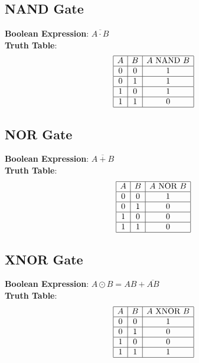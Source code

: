 \documentclass[10pt]{article}
\begin{document}
\begin{multicols}{3}
\subsection{NAND Gate}
\textbf{Boolean Expression}: \( \overline{A \cdot B} \) \\
\textbf{Truth Table}:
\[
\begin{array}{|c|c|c|}
\hline
A & B & A \text{ NAND } B \\
\hline
0 & 0 & 1 \\\hline
0 & 1 & 1 \\\hline
1 & 0 & 1 \\\hline
1 & 1 & 0 \\\hline
\end{array}
\]

\subsection{NOR Gate}
\textbf{Boolean Expression}: \( \overline{A + B} \) \\
\textbf{Truth Table}:
\[
\begin{array}{|c|c|c|}
\hline
A & B & A \text{ NOR } B \\
\hline
0 & 0 & 1 \\\hline
0 & 1 & 0 \\\hline
1 & 0 & 0 \\\hline
1 & 1 & 0 \\\hline
\end{array}
\]

\subsection{XNOR Gate}
\textbf{Boolean Expression}: \( A \odot B = AB + \overline{AB} \) \\
\textbf{Truth Table}:
\[
\begin{array}{|c|c|c|}
\hline
A & B & A \text{ XNOR } B \\
\hline
0 & 0 & 1 \\\hline
0 & 1 & 0 \\\hline
1 & 0 & 0 \\\hline
1 & 1 & 1 \\\hline
\end{array}
\]



\end{multicols}
\end{document}
